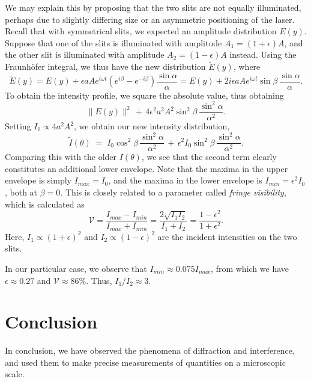\documentclass[11pt]{article}
\begin{document}
        We may explain this by proposing that the two slits are not equally illuminated, perhaps due to slightly differing size
        or an asymmetric positioning of the laser. Recall that with symmetrical slits, we expected an amplitude distribution $E(y)$.
        Suppose that one of the slits is illuminated with amplitude $A_1 = (1 + \epsilon)A$, and the other slit 
        is illuminated with amplitude $A_2 = (1 - \epsilon)A$ instead.
        Using the Fraunh\"ofer integral, we thus have the new distribution $\tilde{E}(y)$, where
        \[
                \tilde{E}(y) = E(y) + \epsilon a A e^{i\omega t}(e^{i\beta} - e^{-i\beta}) \frac{\sin\alpha}{\alpha} = 
                        E(y) + 2i\epsilon aAe^{i\omega t}\sin\beta\, \frac{\sin\alpha}{\alpha}.
        \]
        To obtain the intensity profile, we square the absolute value, thus obtaining
        \[
                \| E(y) \|^2 \,+\, 4\epsilon^2a^2A^2\sin^2\beta\,\frac{\sin^2\alpha}{\alpha^2}.
        \]
        Setting $I_0 \propto 4a^2A^2$, we obtain our new intensity distribution,
        \[
                \tilde{I}(\theta) \;=\; I_0\cos^2\beta\,\frac{\sin^2\alpha}{\alpha^2} \,+\, \epsilon^2I_{0}\sin^2\beta\,\frac{\sin^2\alpha}{\alpha^2}.
        \]
        Comparing this with the older $I(\theta)$, we see that the second term clearly constitutes an additional lower envelope.
        Note that the maxima in the upper envelope is simply $I_{max} = I_0$,
        and the maxima in the lower envelope is $I_{min} = \epsilon^2 I_0$, both at $\beta = 0$.
        This is closely related to a parameter called \textit{fringe visibility}, which is calculated as
        \[
                \mathcal{V} = \frac{I_{max} - I_{min}}{I_{max} + I_{min}} = \frac{2\sqrt{I_1I_2}}{I_1 + I_2}
                        = \frac{1 - \epsilon^2}{1 + \epsilon^2}.
        \]
        Here, $I_1 \propto (1 + \epsilon)^2$ and $I_2 \propto (1 - \epsilon)^2$ are the incident intensities on the two slits.

        In our particular case, we observe that $I_{min} \approx 0.075 I_{max}$, from which we have $\epsilon \approx 0.27$ and
        $\mathcal{V} \approx 86\%$. Thus, $I_1 / I_2 \approx 3$.

        
        \section{Conclusion}
        In conclusion, we have observed the phenomena of diffraction and interference, and used them to make precise measurements
        of quantities on a microscopic scale.

        \nocite{*}
        
        
\end{document}
